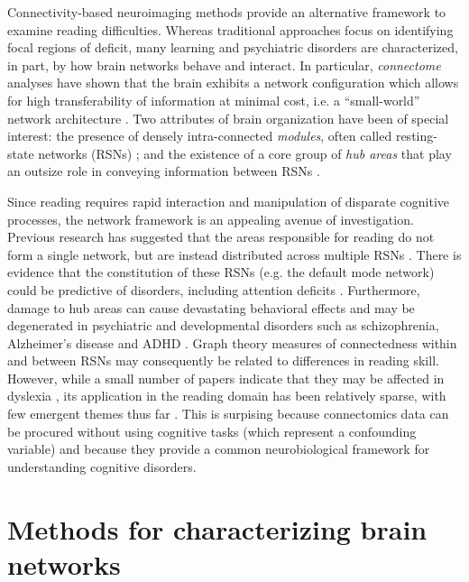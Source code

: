 Connectivity-based neuroimaging methods provide an alternative framework to examine reading difficulties. Whereas traditional approaches focus on identifying focal regions of deficit, many learning and psychiatric disorders are characterized, in part, by how brain networks behave and interact. In particular, \textit{connectome} analyses have shown that the brain exhibits a network configuration which allows for high transferability of information at minimal cost, i.e. a ``small-world'' network architecture \citep{Bullmore2012}. Two attributes of brain organization have been of special interest: the presence of densely intra-connected \textit{modules}, often called resting-state networks (RSNs) \citep{Sporns2016}; and the existence of a core group of \textit{hub areas} that play an outsize role in conveying information between RSNs \citep{VandenHeuvel2011}. 

Since reading requires rapid interaction and manipulation of disparate cognitive processes, the network framework is an appealing avenue of investigation. Previous research has suggested that the areas responsible for reading do not form a single network, but are instead distributed across multiple RSNs \citep{Vogel2013}. There is evidence that the constitution of these RSNs (e.g. the default mode network) could be predictive of disorders, including attention deficits \citep{Uddin2008}. Furthermore, damage to hub areas can cause devastating behavioral effects \citep{Warren2014} and may be degenerated in psychiatric and developmental disorders such as schizophrenia, Alzheimer's disease and ADHD \citep{Stam2014}. Graph theory measures of connectedness within and between RSNs may consequently be related to differences in reading skill. However, while a small number of papers indicate that they may be affected in dyslexia \citep{Qi2016, Finn2014}, its application in the reading domain has been relatively sparse, with few emergent themes thus far \citep{Cao2016}. This is surpising because connectomics data can be procured without using cognitive tasks (which represent a confounding variable) and because they provide a common neurobiological framework for understanding cognitive disorders.

\section{Methods for characterizing brain networks}

